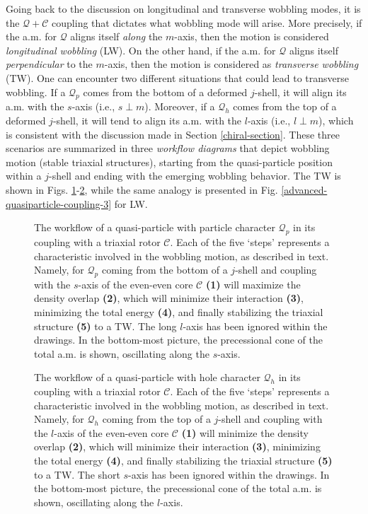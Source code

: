 Going back to the discussion on longitudinal and transverse wobbling modes, it is the $\mathcal{Q}+\mathscr{C}$ coupling that dictates what wobbling mode will arise. More precisely, if the a.m. for $\mathcal{Q}$ aligns itself \emph{along} the $m$-axis, then the motion is considered \emph{longitudinal wobbling} (LW). On the other hand, if the a.m. for $\mathcal{Q}$ aligns itself \emph{perpendicular} to the $m$-axis, then the motion is considered as \emph{transverse wobbling} (TW). One can encounter two different situations that could lead to transverse wobbling. If a $\mathcal{Q}_p$ comes from the bottom of a deformed $j$-shell, it will align its a.m. with the $s$-axis (i.e., $s\perp m$). Moreover, if a $\mathcal{Q}_h$ comes from the top of a deformed $j$-shell, it will tend to align its a.m. with the $l$-axis (i.e., $l\perp m$), which is consistent with the discussion made in Section \ref{chiral-section}. These three scenarios are summarized in three \emph{workflow diagrams} that depict wobbling motion (stable triaxial structures), starting from the quasi-particle position within a $j$-shell and ending with the emerging wobbling behavior. The TW is shown in Figs. \ref{advanced-quasiparticle-coupling-1}-\ref{advanced-quasiparticle-coupling-2}, while the same analogy is presented in Fig. \ref{advanced-quasiparticle-coupling-3} for LW.
\begin{figure}
    \centering
    
    \caption{The workflow of a quasi-particle with particle character $\mathcal{Q}_p$ in its coupling with a triaxial rotor $\mathscr{C}$. Each of the five `steps' represents a characteristic involved in the wobbling motion, as described in text. Namely, for $\mathcal{Q}_p$ coming from the bottom of a $j$-shell and coupling with the $s$-axis of the even-even core $\mathscr{C}$ \textbf{(1)} will maximize the density overlap \textbf{(2)}, which will minimize their interaction \textbf{(3)}, minimizing the total energy \textbf{(4)}, and finally stabilizing the triaxial structure \textbf{(5)} to a TW. The long $l$-axis has been ignored within the drawings. In the bottom-most picture, the precessional cone of the total a.m. is shown, oscillating along the $s$-axis.}
    \label{advanced-quasiparticle-coupling-1}
\end{figure}
\begin{figure}
    \centering
    
    \caption{The workflow of a quasi-particle with hole character $\mathcal{Q}_h$ in its coupling with a triaxial rotor $\mathscr{C}$. Each of the five `steps' represents a characteristic involved in the wobbling motion, as described in text. Namely, for $\mathcal{Q}_h$ coming from the top of a $j$-shell and coupling with the $l$-axis of the even-even core $\mathscr{C}$ \textbf{(1)} will minimize the density overlap \textbf{(2)}, which will minimize their interaction \textbf{(3)}, minimizing the total energy \textbf{(4)}, and finally stabilizing the triaxial structure \textbf{(5)} to a TW. The short $s$-axis has been ignored within the drawings. In the bottom-most picture, the precessional cone of the total a.m. is shown, oscillating along the $l$-axis.}
    \label{advanced-quasiparticle-coupling-2}
\end{figure}
